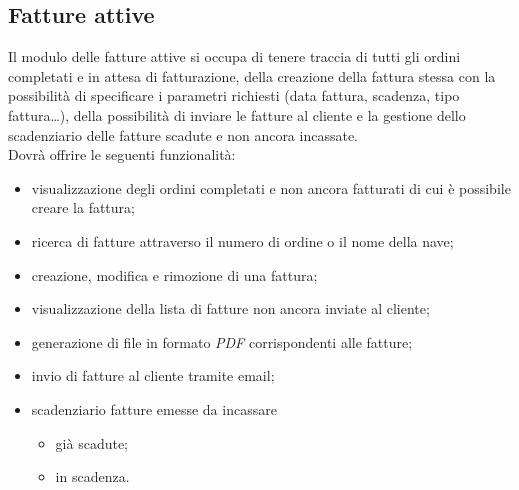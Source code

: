 	\subsection{Fatture attive}
	\label{mod:fa}
	Il modulo delle fatture attive si occupa di tenere traccia di tutti gli ordini completati e in attesa
	di fatturazione, della creazione della fattura stessa con la possibilità di specificare i parametri
	richiesti (data fattura, scadenza, tipo fattura…), della possibilità di inviare le fatture al cliente e
	la gestione dello scadenziario delle fatture scadute e non ancora incassate.\\
	Dovrà offrire le seguenti funzionalità:
	\begin{itemize}
		\item visualizzazione degli ordini completati e non ancora fatturati di cui è possibile creare la fattura;
		\item ricerca di fatture attraverso il numero di ordine o il nome della nave;
		\item creazione, modifica e rimozione di una fattura;
		\item visualizzazione della lista di fatture non ancora inviate al cliente;
		\item generazione di file in formato \textit{PDF} corrispondenti alle fatture;
		\item invio di fatture al cliente tramite email;
		\item scadenziario fatture emesse da incassare
		\begin{itemize}
			\item già scadute;
			\item in scadenza.
		\end{itemize}
	\end{itemize}
	
